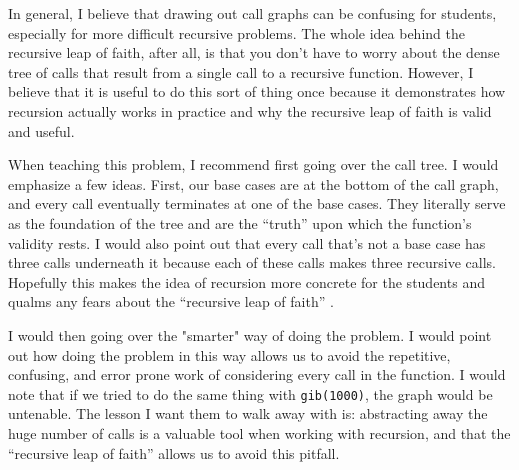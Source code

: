 \begin{questionmeta}
In general, I believe that drawing out call graphs can be confusing for students, especially for more difficult recursive problems. The whole idea behind the recursive leap of faith, after all, is that you don't have to worry about the dense tree of calls that result from a single call to a recursive function. However, I believe that it is useful to do this sort of thing once because it demonstrates how recursion actually works in practice and why the recursive leap of faith is valid and useful.

When teaching this problem, I recommend first going over the call tree. I would emphasize a few ideas. First, our base cases are at the bottom of the call graph, and every call eventually terminates at one of the base cases. They literally serve as the foundation of the tree and are the ``truth'' upon which the function's validity rests. I would also point out that every call that's not a base case has three calls underneath it because each of these calls makes three recursive calls. Hopefully this makes the idea of recursion more concrete for the students and qualms any fears about the ``recursive leap of faith'' . 

I would then going over the "smarter" way of doing the problem. I would point out how doing the problem in this way allows us to avoid the repetitive, confusing, and error prone work of considering every call in the function. I would note that if we tried to do the same thing with \lstinline{gib(1000)}, the graph would be untenable. The lesson I want them to walk away with is: abstracting away the huge number of calls is a valuable tool when working with recursion, and that the ``recursive leap of faith'' allows us to avoid this pitfall. 
\end{questionmeta}